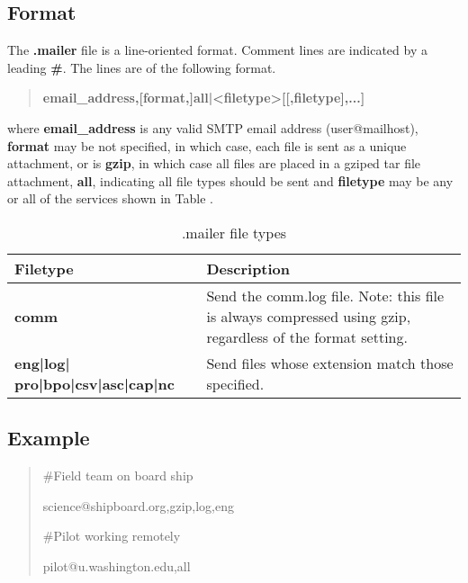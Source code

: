 \documentclass[12pt,english,twoside]{book}
\providecommand{\tabularnewline}{\\}
\begin{document}
\subsection{Format}

The \textbf{.mailer} file is a line-oriented format. Comment lines
are indicated by a leading \textbf{\#}. The lines are of the following
format.

\begin{quote}
\textbf{email\_address,{[}format,]all|<filetype>{[}{[},filetype],...]}
\end{quote}
where \textbf{email\_address} is any valid SMTP email address (user@mailhost),
\textbf{format} may be not specified, in which case, each file is sent as a
unique attachment, or is \textbf{gzip}, in which case all files are placed in a
gziped tar file attachment, \textbf{all}, indicating all file types should be
sent and \textbf{filetype} may be any or all of the services shown in Table .

%
\begin{table}[H]

\caption{.mailer file types}

\begin{tabular}{|l|p{3.5in}|}
\hline 
\textbf{Filetype}&
\textbf{Description}\tabularnewline
\hline
\hline 
\textbf{comm}&
Send the comm.log file.  Note: this file is always compressed using gzip, 
regardless of the format setting.\tabularnewline
\hline 
\textbf{eng|log| pro|bpo|csv|asc|cap|nc}&
Send files whose extension match those specified.
\tabularnewline
\hline
\end{tabular}
\end{table}

\subsection{Example}
\begin{quotation}
\#Field team on board ship

science@shipboard.org,gzip,log,eng

\#Pilot working remotely

pilot@u.washington.edu,all

\end{quotation}
\end{document}
